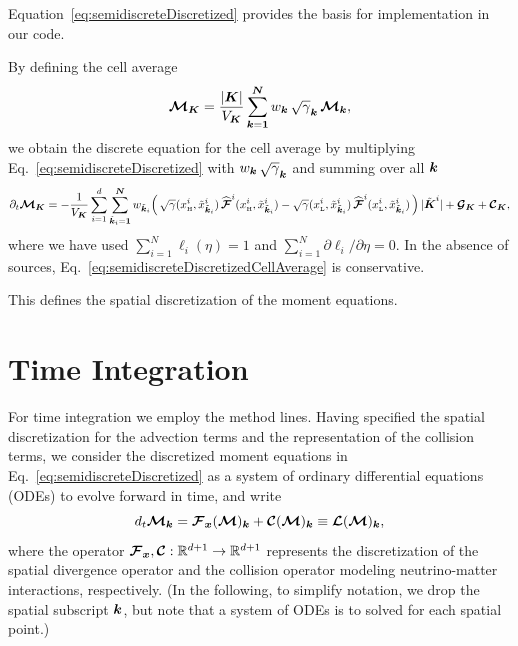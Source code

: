 \documentclass[10pt,preprint]{aastex}
\begin{document}
Equation~\eqref{eq:semidiscreteDiscretized} provides the basis for implementation in our code.  

By defining the cell average
\begin{equation}
  \boldsymbol{\mathcal{M}}_{\boldsymbol{K}}=\frac{|\boldsymbol{K}|}{V_{\boldsymbol{K}}}\sum_{\boldsymbol{k}=\boldsymbol{1}}^{\boldsymbol{N}}w_{\boldsymbol{k}}\,\sqrt{\gamma}_{\boldsymbol{k}}\,\boldsymbol{\mathcal{M}}_{\boldsymbol{k}},
  \label{eq:conservedCellAverage}
\end{equation}
we obtain the discrete equation for the cell average by multiplying Eq.~\eqref{eq:semidiscreteDiscretized} with $w_{\boldsymbol{k}}\,\sqrt{\gamma}_{\boldsymbol{k}}$ and summing over all $\boldsymbol{k}$
\begin{equation}
  \partial_{t}{\boldsymbol{\mathcal{M}}_{\boldsymbol{K}}}
  =-\frac{1}{V_{\boldsymbol{K}}}\sum_{i=1}^{d}\sum_{\tilde{\boldsymbol{k}}_{i}=\boldsymbol{1}}^{\boldsymbol{N}}w_{\tilde{\boldsymbol{k}}_{i}}
  \Big(\,
    \sqrt{\gamma}(x_{\mbox{\tiny H}}^{i},\tilde{x}_{\tilde{\boldsymbol{k}}_{i}}^{i})\,\widehat{\boldsymbol{\mathcal{F}}}^{i}(x_{\mbox{\tiny H}}^{i},\tilde{x}_{\tilde{\boldsymbol{k}}_{i}}^{i})
    -\sqrt{\gamma}(x_{\mbox{\tiny L}}^{i},\tilde{x}_{\tilde{\boldsymbol{k}}_{i}}^{i})\,\widehat{\boldsymbol{\mathcal{F}}}^{i}(x_{\mbox{\tiny L}}^{i},\tilde{x}_{\tilde{\boldsymbol{k}}_{i}}^{i})
  \,\Big)\,|\tilde{\boldsymbol{K}}^{i}|
  +\boldsymbol{\mathcal{G}}_{\boldsymbol{K}}+\boldsymbol{\mathcal{C}}_{\boldsymbol{K}},
  \label{eq:semidiscreteDiscretizedCellAverage}
\end{equation}
where we have used $\sum_{i=1}^{N}\ell_{i}(\eta)=1$ and $\sum_{i=1}^{N}\partial\ell_{i}/\partial\eta=0$.  
In the absence of sources, Eq.~\eqref{eq:semidiscreteDiscretizedCellAverage} is conservative.  

This defines the spatial discretization of the moment equations.  

\section{Time Integration}

For time integration we employ the method lines.  
Having specified the spatial discretization for the advection terms and the representation of the collision terms, we consider the discretized moment equations in Eq.~\eqref{eq:semidiscreteDiscretized} as a system of ordinary differential equations (ODEs) to evolve forward in time, and write
\begin{equation}
  d_{t}\boldsymbol{\mathcal{M}}_{\boldsymbol{k}}
  =\boldsymbol{\mathcal{F}}_{\boldsymbol{x}}(\boldsymbol{\mathcal{M}})_{\boldsymbol{k}}+\boldsymbol{\mathcal{C}}(\boldsymbol{\mathcal{M}})_{\boldsymbol{k}}
  \equiv\boldsymbol{\mathcal{L}}(\boldsymbol{\mathcal{M}})_{\boldsymbol{k}},
  \label{eq:momentEquationsODEs}
\end{equation}
where the operator $\boldsymbol{\mathcal{F}}_{\boldsymbol{x}},\boldsymbol{\mathcal{C}}:\mathbb{R}^{d+1}\to\mathbb{R}^{d+1}$ represents the discretization of the spatial divergence operator and the collision operator modeling neutrino-matter interactions, respectively.  
(In the following, to simplify notation, we drop the spatial subscript $\boldsymbol{k}$, but note that a system of ODEs is to solved for each spatial point.)
\end{document}
